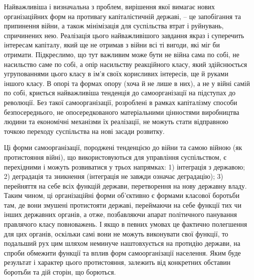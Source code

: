 \documentclass[../main]{subfiles}
\begin{document}
Найважливіша і визначальна з проблем, вирішення якої вимагає нових організаційних форм на противагу капіталістичній державі, – це запобігання та припинення війни, а також мінімізація для суспільства втрат і руйнувань, спричинених нею. Реалізація цього найважливішого завдання якраз і суперечить інтересам капіталу, який ще не отримав з війни всі ті вигоди, які міг би отримати. Підкреслимо, що тут важливим може бути не війна сама по собі, не насильство саме по собі, а опір насильству реакційного класу, який здійснюється угрупованнями цього класу в ім’я своїх корисливих інтересів, ще й руками іншого класу. В опорі та формах опору (хоча й не лише в них), а не у війні самій по собі, криється найважливіша тенденція до самоорганізації на підступах до революції. Без такої самоорганізації, розроблені в рамках капіталізму способи безпосереднього, не опосередкованого матеріальними цінностями виробництва людини та економічні механізми їх реалізації, не можуть стати відправною точкою переходу суспільства на нові засади розвитку.

Ці форми самоорганізації, породжені тенденцією до війни та самою війною (як протистояння війні), що використовуються для управління суспільством, є перехідними і можуть розвиватися у трьох напрямках: 1) інтеграція з державою; 2) деградація та зникнення (інтеграція не завжди означає деградацію); 3) перейняття на себе всіх функцій держави, перетворення на нову державну владу. Таким чином, ці організаційні форми об’єктивно є формами класової боротьби там, де вони змушені протистояти державі, переймаючи на себе функції тих чи інших державних органів, а отже, позбавляючи апарат політичного панування правлячого класу повноважень. І якщо в певних умовах це фактично полегшення для цих органів, оскільки самі вони не можуть виконувати свої функції, то подальший рух цим шляхом неминуче наштовхується на протидію держави, на спроби обмежити функції та вплив форм самоорганізації населення. Яким буде результат і характер цього протистояння, залежить від конкретних обставин боротьби та дій сторін, що борються.
\end{document}
